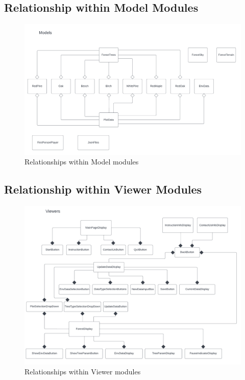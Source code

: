 \documentclass[12pt, titlepage]{article}
\begin{document}
\subsection{Relationship within Model Modules} \label{SecRBMM}
\begin{figure}[H]
\centering
\caption{Relationships within Model modules}
\label{FigRelaModels}
\includegraphics[scale=0.65]{Model-Modules.png}
\end{figure}

\newpage

\subsection{Relationship within Viewer Modules} \label{SecRBVM}
\begin{figure}[H]
\centering
\caption{Relationships within Viewer modules}
\label{FigRelaViewers}
\includegraphics[scale=0.65]{Viewer-Modules.png}
\end{figure}
\end{document}
